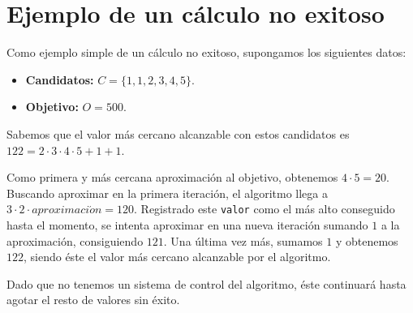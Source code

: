\chapter{Ejemplo de un cálculo no exitoso}

Como ejemplo simple de un cálculo no exitoso, supongamos los siguientes datos:

\begin{itemize}
	\item\textbf{Candidatos:} $C=\{1,1,2,3,4,5\}$.
	\item\textbf{Objetivo:} $O=500$.
\end{itemize}

Sabemos que el valor más cercano alcanzable con estos candidatos es $122=2\cdot3\cdot4\cdot5+1+1$.

Como primera y más cercana aproximación al objetivo, obtenemos $4\cdot5=20$.
Buscando aproximar en la primera iteración, el algoritmo llega a $3\cdot2\cdot aproximaci\acute on=120$.
Registrado este \texttt{valor} como el más alto conseguido hasta el momento, se intenta aproximar en una nueva iteración sumando $1$ a la aproximación, consiguiendo $121$.
Una última vez más, sumamos $1$ y obtenemos $122$, siendo éste el valor más cercano alcanzable por el algoritmo.

Dado que no tenemos un sistema de control del algoritmo, éste continuará hasta agotar el resto de valores sin éxito.
